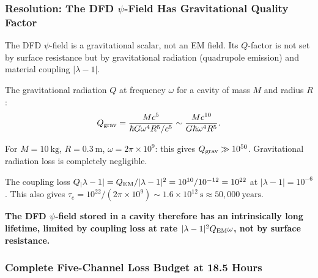 \documentclass[aps,prd,twocolumn,superscriptaddress]{revtex4-2}
\newcommand{\lam}{|\lambda-1|}
\begin{document}
\subsubsection{Resolution: The DFD $\psi$-Field Has Gravitational Quality Factor}

The DFD $\psi$-field is a gravitational scalar, not an EM field.
Its $Q$-factor is not set by surface resistance but by gravitational
radiation (quadrupole emission) and material coupling $\lam$.

The gravitational radiation $Q$ at frequency $\omega$ for a cavity
of mass $M$ and radius $R$:
\begin{equation}
Q_{\rm grav} = \frac{Mc^5}{\hbar G\omega^4 R^5/c^5}
\sim \frac{M c^{10}}{G\hbar\omega^4 R^5}.
\end{equation}

For $M = 10~\mathrm{kg}$, $R = 0.3~\mathrm{m}$, $\omega = 2\pi\times 10^9$:
this gives $Q_{\rm grav} \gg 10^{50}$.  Gravitational radiation loss
is completely negligible.

The coupling loss $Q_\lam = Q_{\rm EM}/\lam^2 = 10^{10}/10^{-12} = 10^{22}$
at $\lam = 10^{-6}$.  This also gives $\tau_e = 10^{22}/(2\pi\times 10^9)
\sim 1.6\times 10^{12}~\mathrm{s} \approx 50{,}000~\mathrm{years}$.

\textbf{The DFD $\psi$-field stored in a cavity therefore has an
intrinsically long lifetime, limited by coupling loss at rate
$\lam^2 Q_{\rm EM}\omega$, not by surface resistance.}

\subsubsection{Complete Five-Channel Loss Budget at 18.5 Hours}
\end{document}
